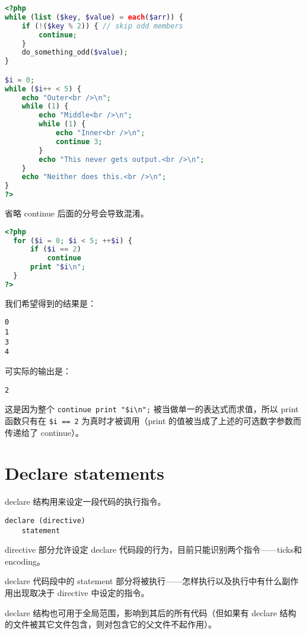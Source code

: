 \begin{lstlisting}[language=PHP]
<?php
while (list ($key, $value) = each($arr)) {
    if (!($key % 2)) { // skip odd members
        continue;
    }
    do_something_odd($value);
}

$i = 0;
while ($i++ < 5) {
    echo "Outer<br />\n";
    while (1) {
        echo "Middle<br />\n";
        while (1) {
            echo "Inner<br />\n";
            continue 3;
        }
        echo "This never gets output.<br />\n";
    }
    echo "Neither does this.<br />\n";
}
?>
\end{lstlisting}

省略 continue 后面的分号会导致混淆。

\begin{lstlisting}[language=PHP]
<?php
  for ($i = 0; $i < 5; ++$i) {
      if ($i == 2)
          continue
      print "$i\n";
  }
?>
\end{lstlisting}

我们希望得到的结果是：

\begin{verbatim}
0
1
3
4
\end{verbatim}

可实际的输出是：

\begin{verbatim}
2
\end{verbatim}

这是因为整个 \texttt{continue print "\$i\textbackslash n";} 被当做单一的表达式而求值，所以 print 函数只有在 \texttt{\$i == 2} 为真时才被调用（print 的值被当成了上述的可选数字参数而传递给了 continue）。


\section{Declare statements}

declare 结构用来设定一段代码的执行指令。

\begin{verbatim}
declare (directive)
    statement
\end{verbatim}

directive 部分允许设定 declare 代码段的行为，目前只能识别两个指令——ticks和encoding。

declare 代码段中的 statement 部分将被执行——怎样执行以及执行中有什么副作用出现取决于 directive 中设定的指令。

declare 结构也可用于全局范围，影响到其后的所有代码（但如果有 declare 结构的文件被其它文件包含，则对包含它的父文件不起作用）。

